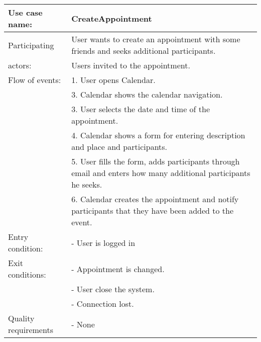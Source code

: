{\tabulinesep=1.2mm
\begin{tabu}{ | p{3cm} | p{13cm} |}
    \hline
    Use case name: 			& 		CreateAppointment\\ \hline
    Participating  			& 		User wants to create an appointment with some friends and seeks additional participants. \\
    actors:					&		Users invited to the appointment.\\ \hline
    Flow of events: 		& 		1. User opens Calendar. \\
							&		3. Calendar shows the calendar navigation.\\
							&		3. User selects the date and time of the appointment.\\
							&		4. Calendar shows a form for entering description and place and participants.\\
							&		5. User fills the form, adds participants through email and enters how many additional participants he seeks.\\
							&		6. Calendar creates the appointment and notify participants that they have been added to the event.\\ \hline
    Entry condition: 		& 		- User is logged in  \\ \hline
	Exit conditions: 		&		- Appointment is changed.\\
							&		- User close the system.\\
							&		- Connection lost.\\\hline
	Quality requirements	&	 	- None \\\hline
\end{tabu}
}
